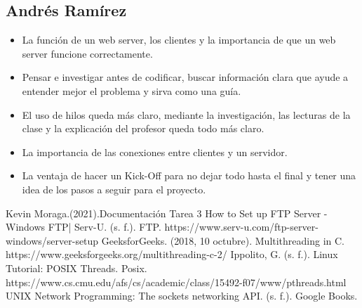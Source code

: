 \documentclass[a4paper,12pt,twoside]{article}
\begin{document}
\subsection{Andrés Ramírez}
\begin{itemize}
    \item La función de un web server, los clientes y la importancia de que un web server funcione correctamente. 
    \item Pensar e investigar antes de codificar, buscar información clara que ayude a entender mejor el problema y sirva como una guía. 
    \item El uso de hilos queda más claro, mediante la investigación, las lecturas de la clase y la explicación del profesor queda todo más claro. 
    \item La importancia de las conexiones entre clientes y un servidor. 
    \item La ventaja de hacer un Kick-Off para no dejar todo hasta el final y tener una idea de los pasos a seguir para el proyecto. 
\end{itemize}

\newpage
\begin{thebibliography}{0}
   Kevin Moraga.(2021).Documentación Tarea 3
   How to Set up FTP Server - Windows FTP| Serv-U. (s. f.). FTP. https://www.serv-u.com/ftp-server-windows/server-setup
   GeeksforGeeks. (2018, 10 octubre). Multithreading in C. https://www.geeksforgeeks.org/multithreading-c-2/
  Ippolito, G. (s. f.). Linux Tutorial: POSIX Threads. Posix. https://www.cs.cmu.edu/afs/cs/academic/class/15492-f07/www/pthreads.html
   UNIX Network Programming: The sockets networking API. (s. f.). Google Books.
  
\end{thebibliography}
\end{document}
